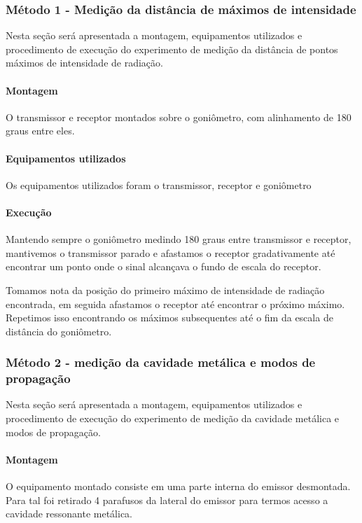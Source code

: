\documentclass[12pt]{article}
\begin{document}
\subsubsection{Método 1 - Medição da distância de máximos de intensidade}
Nesta seção será apresentada a montagem, equipamentos utilizados e
procedimento de execução do experimento de medição da distância de
pontos máximos de intensidade de radiação.

\paragraph{Montagem}
O transmissor e receptor montados sobre o goniômetro,  com
alinhamento de 180 graus entre eles.

\paragraph{Equipamentos utilizados}
Os equipamentos utilizados foram o transmissor, receptor e goniômetro

\paragraph{Execução}
Mantendo sempre o goniômetro medindo 180 graus entre transmissor e
receptor, mantivemos o transmissor parado e afastamos o receptor
gradativamente até encontrar um ponto onde o sinal alcançava o fundo
de escala do receptor.

Tomamos nota da posição do primeiro máximo de intensidade de radiação
encontrada, em seguida afastamos o receptor até encontrar o próximo
máximo. Repetimos isso encontrando os máximos subsequentes até o fim
da escala de distância do goniômetro.

\subsubsection{Método 2 - medição da cavidade metálica e modos de propagação}
Nesta seção será apresentada a montagem, equipamentos utilizados e
procedimento de execução do experimento de medição da cavidade
metálica e modos de propagação.

\paragraph{Montagem}
O equipamento montado consiste em uma parte interna do emissor
desmontada. Para tal foi retirado 4 parafusos da lateral do emissor
para termos acesso a cavidade ressonante metálica.
\end{document}
